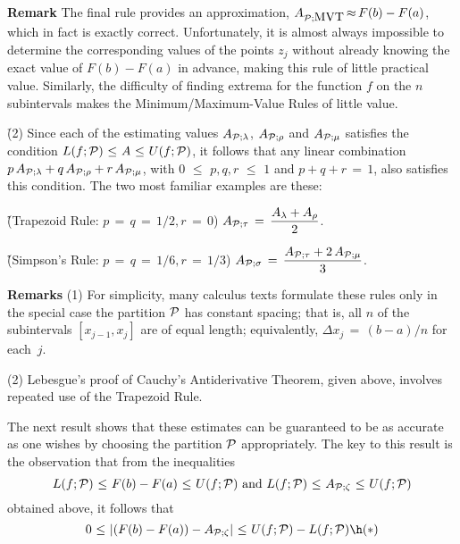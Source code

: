         {\bf Remark} The final rule provides an approximation, $A_{{\cal P}; \mbox{MVT}} \,{\approx}\, F(b)-F(a)$, which in fact is exactly correct.
    Unfortunately, it is almost always impossible to determine the corresponding values of the points $z_{j}$
    without already knowing the exact value of $F(b)-F(a)$ in advance, making this rule of little practical value.
    Similarly, the difficulty of finding extrema for the function $f$ on the $n$ subintervals makes the Minimum/Maximum-Value Rules of little value.


\V

        \h (2) Since each of the estimating values $A_{{\cal P}; {\lambda}}$, $A_{{\cal P}; {\rho}}$ and $A_{{\cal P}; {\mu}}$ satisfies the condition
    $L(f;{\cal P})\,\,{\leq}\,\,A\,\,{\leq}\,\,U(f;{\cal P})$, it follows that any linear combination
    $p\,A_{{\cal P}; {\lambda}} + q\,A_{{\cal P}; {\rho}} + r\,A_{{\cal P}; {\mu}}$,
    with $0\,\,{\leq}\,\,p, q, r\,\,{\leq}\,\,1$ and $p+q+r \,=\, 1$, also satisfies this condition. The two most familiar examples are these:

\VA

        \h \h (Trapezoid Rule: $p \,=\, q \,=\, 1/2, r \,=\, 0$)
    ${\displaystyle A_{{\cal P}; {\tau}} \,=\, \frac{A_{{\lambda}} + A_{{\rho}}}{2}}$.

        \h \h (Simpson's Rule: $p \,=\, q \,=\, 1/6, r \,=\, 1/3$)
    ${\displaystyle A_{{\cal P}; {\sigma}} \,=\, \frac{A_{{\cal P}; {\tau}} + 2\,A_{{\cal P}; {\mu}}}{3}}$.

\V

        {\bf Remarks} (1) For simplicity, many calculus texts formulate these rules only in the special case the partition ${\cal P}$ has constant spacing;
    that is, all $n$ of the subintervals $[x_{j-1},x_{j}]$ are of equal length; equivalently, ${\Delta}x_{j} \,=\, (b-a)/n$ for each~$j$.

\V

        (2) Lebesgue's proof of Cauchy's Antiderivative Theorem, given above, involves repeated use of the Trapezoid Rule.

\VV

        The next result shows that these estimates can be guaranteed to be as accurate as one wishes by choosing the partition ${\cal P}$ appropriately.
    The key to this result is the observation that from the inequalities 
        \begin{displaymath}
        L(f;{\cal P})\,\,{\leq}\,\,F(b)-F(a)\,\,{\leq}\,\,U(f;{\cal P})
    \mbox{ and }
        L(f;{\cal P})\,\,{\leq}\,\,A_{{\cal P}; {\zeta}}\,\,{\leq}\,\,U(f;{\cal P})
        \end{displaymath}
    obtained above, it follows that
        \begin{displaymath}
        0\,\,{\leq}\,\,|(F(b)-F(a)) - A_{{\cal P}; {\zeta}}|\,\,{\leq}\,\,U(f;{\cal P})-L(f;{\cal P}) \h ({\ast})
        \end{displaymath}

